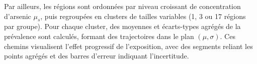 Par ailleurs, les régions sont ordonnées par niveau croissant de concentration d'arsenic $\mu_s$, puis regroupées en clusters de tailles variables (1, 3 ou 17 régions par groupe). Pour chaque cluster, des moyennes et écarts-types agrégés de la prévalence sont calculés, formant des trajectoires dans le plan $(\mu, \sigma)$. Ces chemins visualisent l'effet progressif de l'exposition, avec des segments reliant les points agrégés et des barres d'erreur indiquant l'incertitude.
